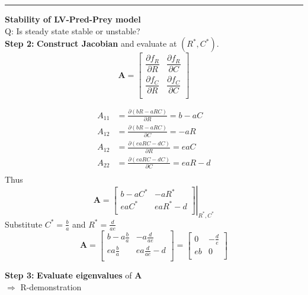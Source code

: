\documentclass{article}
\newcommand{\note}[1]{\colorbox{gray!30}{#1}}
\newcommand{\ind}{\-\hspace{1cm}}
\begin{document}
\rule[0.5ex]{\linewidth}{1pt}

\pagebreak
\textbf{Stability of LV-Pred-Prey model}\\
Q: Is steady state stable or unstable?\\
\textbf{Step 2:} \textbf{Construct Jacobian} and evaluate at $(R^*,C^*)$.\\
\begin{equation*}
	\mathbf{A}=
	\begin{bmatrix}
		\dfrac{\partial f_R}{\partial R} & \dfrac{\partial f_R}{\partial C}\\[1em]
		\dfrac{\partial f_C}{\partial R} & \dfrac{\partial f_C}{\partial C}\\
	\end{bmatrix}
\end{equation*}

\begin{align*}
	A_{11} &= \frac{ \partial (bR-aRC)}{\partial R} = b-aC\\
		A_{12} &= \frac{ \partial (bR-aRC)}{\partial C} = -aR\\
			A_{12} &= \frac{ \partial (eaRC-dC)}{\partial R} = eaC\\
				A_{22} &= \frac{ \partial (eaRC-dC)}{\partial C} = eaR-d\\
\end{align*}
Thus
\begin{equation*}
	\mathbf{A}=
\left.	\begin{bmatrix}
		b-a C^* & -aR^*\\[1em]
		eaC^* & eaR^*-d\\
	\end{bmatrix}
	\right |_{R^*,C^*}
\end{equation*}
Substitute $C^*=\frac{b}{a}$ and $R^*=\frac{d}{ae}$
\begin{equation*}
	\mathbf{A}=
	\begin{bmatrix}
		b-a \frac{b}{a} & -a \frac{d}{ae}\\[1em]
		ea\frac{b}{a} & ea\frac{d}{ae}-d\\
	\end{bmatrix}
	=\begin{bmatrix}
			0 & -\frac{d}{e}\\[1em]
			eb & 0\\
	\end{bmatrix}
\end{equation*}

\textbf{Step 3:} \textbf{Evaluate eigenvalues} of $\mathbf{A}$\\
\ind \note{$\Rightarrow $ R-demonstration}
\end{document}
